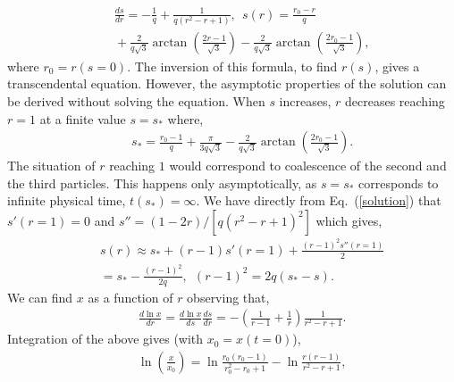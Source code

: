 \begin{eqnarray}&&\!\!\!\!\!\!\!\!\!\!\!\!\!\!\!\!
\frac{ds}{dr}=-\frac{1}{q}+\frac{1}{q(r^2\!-\!r\!+\!1)},\ \ s(r)=\frac{r_0-r}{q} \label{solution} \\&&\!\!\!\!\!\!\!\!\!\!\!\!\!\!\!\!\!+\frac{2}{q\sqrt{3}}\arctan\left(\frac{2r-1}{\sqrt{3}}\right)
-\frac{2}{q\sqrt{3}}\arctan\left(\frac{2r_0-1}{\sqrt{3}}\right),\nonumber
\end{eqnarray}
where $r_0=r(s=0)$. The inversion of this formula, to find $r(s)$, gives a  transcendental equation. However, the asymptotic properties of the solution can be derived without solving the equation. When $s$ increases, $r$ decreases reaching $r=1$ at a finite value $s=s_*$ where,
\begin{eqnarray}&&\!\!\!\!\!\!\!\!\!\!\!\!\!\!\!\!
s_*=\frac{r_0-1}{q}+\frac{\pi}{3q\sqrt{3}}-\frac{2}{q\sqrt{3}}\arctan\left(\frac{2r_0-1}{\sqrt{3}}\right).
\end{eqnarray}
The situation of $r$ reaching $1$ would correspond to coalescence of the second and the third particles. This happens only asymptotically, as $s=s_*$ corresponds to infinite physical time, $t(s_*)=\infty$. 
We have directly from Eq.~(\ref{solution}) that $s'(r=1)=0$ and $s''=(1-2r)/[q(r^2\!-\!r\!+\!1)^2]$ which gives,
\begin{eqnarray}&&\!\!\!\!\!\!\!\!\!\!\!\!\!\!\!\!
s(r)\approx s_*+(r-1)s'(r=1)+\frac{(r-1)^2s''(r=1)}{2}\nonumber\\&&\!\!\!\!\!\!\!\!\!\!\!\!\!\!\!\!\!
=s_*-\frac{(r-1)^2}{2q},\ \ (r-1)^2=2q(s_*-s). \label{rs}
\end{eqnarray}
We can find $x$ as a function of $r$ observing that,
\begin{eqnarray}&&\!\!\!\!\!\!\!\!\!\!\!\!\!\!\!\!
\frac{d\ln x}{dr}=\frac{d\ln x}{ds}\frac{ds}{dr}
=-\left(\frac{1}{r-1}+\frac{1}{r}\right)\frac{1}{r^2\!-\!r\!+\!1}.
\end{eqnarray}
Integration of the above gives (with $x_0=x(t=0)$),
\begin{eqnarray}&&\!\!\!\!\!\!\!\!\!\!\!\!\!\!\!\!
\ln \left(\frac{x}{x_0}\right)=\ln\frac{r_0(r_0-1)}{r_0^2\!-\!r_0\!+\!1}-\ln\frac{r(r-1)}{r^2\!-\!r\!+\!1},\label{rsol}
\end{eqnarray}
